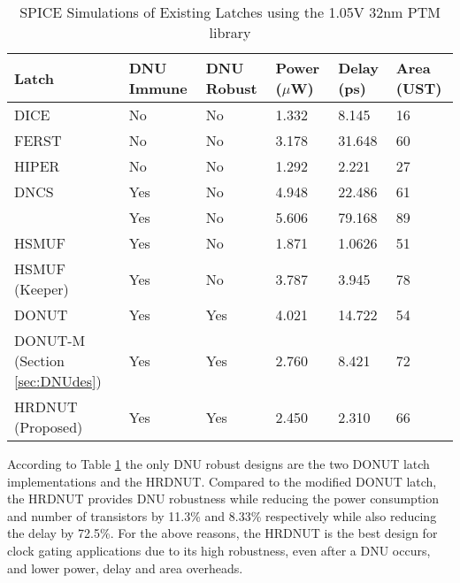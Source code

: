 \begin{table}[h]
\begin{center}
	\caption{SPICE Simulations of Existing Latches using the 1.05V 32nm PTM library }
	\label{table:rtable}
	\begin{tabular}{|m{5em}|m{3.5em}|m{3em}|m{3em}|m{3em}|m{3em}|}
	\hline
	Latch & DNU Immune & DNU Robust & Power ($\mu$W) & Delay (ps) & Area (UST)\\ 
	\hline
	DICE & No & No & 1.332 & 8.145 & 16 \\
	\hline
	FERST & No & No & 3.178 & 31.648 & 60 \\
	\hline
	HIPER & No & No & 1.292 & 2.221 & 27 \\
	\hhline{|=|=|=|=|=|=|}
	DNCS & Yes & No & 4.948 & 22.486 & 61 \\
	\hline
	\cite{Inter} & Yes & No & 5.606 & 79.168 & 89 \\
	\hline
	HSMUF & Yes & No & 1.871 & 1.0626 & 51 \\
	\hline
	HSMUF (Keeper) & Yes & No & 3.787 & 3.945 & 78 \\
	\hhline{|=|=|=|=|=|=|}
	DONUT \cite{DONUT} & Yes & Yes & 4.021 & 14.722 & 54 \\ 
	\hline
	DONUT-M (Section \ref{sec:DNUdes}) & Yes & Yes & 2.760 & 8.421 & 72\\
	\hline
	HRDNUT (Proposed) & Yes & Yes & 2.450 & 2.310 & 66 \\
	\hline
	\end{tabular}
\end{center}
\end{table}

According to Table \ref{table:rtable} the only DNU robust designs are the two DONUT latch implementations and the HRDNUT. Compared to the modified DONUT latch, the HRDNUT provides DNU robustness while reducing the power consumption and number of transistors by 11.3\% and 8.33\% respectively while also reducing the delay by 72.5\%. For the above reasons, the HRDNUT is the best design for clock gating applications due to its high robustness, even after a DNU occurs, and lower power, delay and area overheads.
